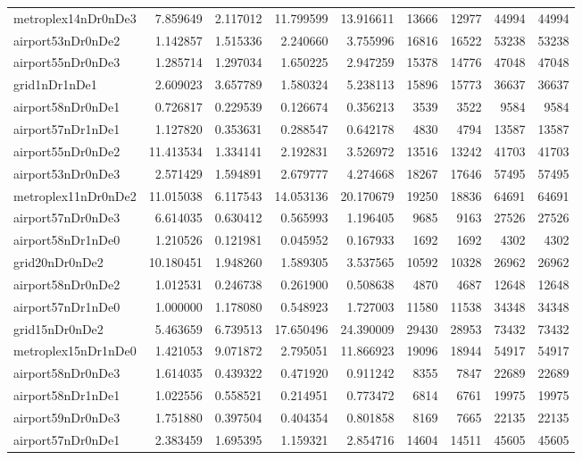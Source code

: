 \begin{longtable}{|l|r|r|r|r|r|r|r|r|}
metroplex14nDr0nDe3 & 7.859649 & 2.117012 & 11.799599 & 13.916611 & 13666 & 12977 & 44994 & 44994 \\
airport53nDr0nDe2 & 1.142857 & 1.515336 & 2.240660 & 3.755996 & 16816 & 16522 & 53238 & 53238 \\
airport55nDr0nDe3 & 1.285714 & 1.297034 & 1.650225 & 2.947259 & 15378 & 14776 & 47048 & 47048 \\
grid1nDr1nDe1 & 2.609023 & 3.657789 & 1.580324 & 5.238113 & 15896 & 15773 & 36637 & 36637 \\
airport58nDr0nDe1 & 0.726817 & 0.229539 & 0.126674 & 0.356213 & 3539 & 3522 & 9584 & 9584 \\
airport57nDr1nDe1 & 1.127820 & 0.353631 & 0.288547 & 0.642178 & 4830 & 4794 & 13587 & 13587 \\
airport55nDr0nDe2 & 11.413534 & 1.334141 & 2.192831 & 3.526972 & 13516 & 13242 & 41703 & 41703 \\
airport53nDr0nDe3 & 2.571429 & 1.594891 & 2.679777 & 4.274668 & 18267 & 17646 & 57495 & 57495 \\
metroplex11nDr0nDe2 & 11.015038 & 6.117543 & 14.053136 & 20.170679 & 19250 & 18836 & 64691 & 64691 \\
airport57nDr0nDe3 & 6.614035 & 0.630412 & 0.565993 & 1.196405 & 9685 & 9163 & 27526 & 27526 \\
airport58nDr1nDe0 & 1.210526 & 0.121981 & 0.045952 & 0.167933 & 1692 & 1692 & 4302 & 4302 \\
grid20nDr0nDe2 & 10.180451 & 1.948260 & 1.589305 & 3.537565 & 10592 & 10328 & 26962 & 26962 \\
airport58nDr0nDe2 & 1.012531 & 0.246738 & 0.261900 & 0.508638 & 4870 & 4687 & 12648 & 12648 \\
airport57nDr1nDe0 & 1.000000 & 1.178080 & 0.548923 & 1.727003 & 11580 & 11538 & 34348 & 34348 \\
grid15nDr0nDe2 & 5.463659 & 6.739513 & 17.650496 & 24.390009 & 29430 & 28953 & 73432 & 73432 \\
metroplex15nDr1nDe0 & 1.421053 & 9.071872 & 2.795051 & 11.866923 & 19096 & 18944 & 54917 & 54917 \\
airport58nDr0nDe3 & 1.614035 & 0.439322 & 0.471920 & 0.911242 & 8355 & 7847 & 22689 & 22689 \\
airport58nDr1nDe1 & 1.022556 & 0.558521 & 0.214951 & 0.773472 & 6814 & 6761 & 19975 & 19975 \\
airport59nDr0nDe3 & 1.751880 & 0.397504 & 0.404354 & 0.801858 & 8169 & 7665 & 22135 & 22135 \\
airport57nDr0nDe1 & 2.383459 & 1.695395 & 1.159321 & 2.854716 & 14604 & 14511 & 45605 & 45605 \\

\end{longtable}
